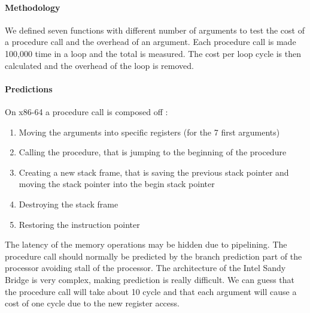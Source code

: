 \paragraph{Methodology}
We defined seven functions with different number of arguments to test the
cost of a procedure call and the overhead of an argument.
Each procedure call is made 100,000 time in a loop and the total is measured.
The cost per loop cycle is then calculated and the overhead of the loop is
removed.

\paragraph{Predictions}
On x86-64 a procedure call is composed off :
\begin{enumerate}
\item Moving the arguments into specific registers (for the 7 first arguments)
\item Calling the procedure, that is jumping to the beginning of the procedure
\item Creating a new stack frame, that is saving the previous stack pointer and
moving the stack pointer into the begin stack pointer
\item Destroying the stack frame
\item Restoring the instruction pointer
\end{enumerate}

The latency of the memory operations may be hidden due to pipelining.
The procedure call should normally be predicted by the branch prediction part of
the processor avoiding stall of the processor.
The architecture of the Intel Sandy Bridge is very complex, making prediction is
really difficult.
We can guess that the procedure call will take about 10 cycle and that each
argument will cause a cost of one cycle due to the new register access.

